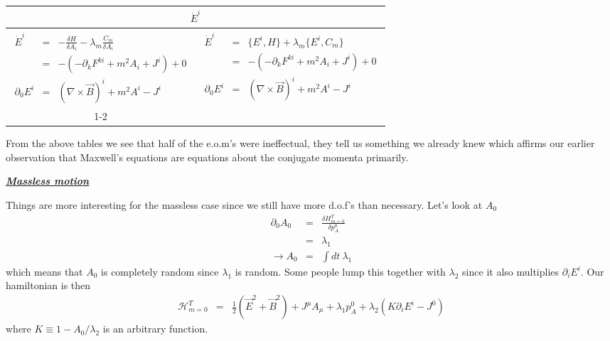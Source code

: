 \documentclass[aps,preprint,preprintnumbers,nofootinbib,showpacs,prd]{revtex4-1}
\newcommand{\ba}{\begin{array}}
\newcommand{\ea}{\end{array}}
\newcommand{\nbea}{\begin{eqnarray*}}
\newcommand{\neea}{\end{eqnarray*}}
\begin{document}
\begin{center}
    \begin{tabular}{ | c c |}
    \hline
    \multicolumn{2}{|c|}{$\dot E^i$} \\
    \hline
    $\ba {rcl}
\dot E^i & = & -\frac{\delta H}{\delta A_i} - \lambda_m \frac{C_m}{\delta A_i} \\
& = & -(-\partial_k F^{ki} + m^2 A_i + J^i) + 0 \\
\partial_0 E^i & = & (\nabla \times \vec B)^i + m^2 A^i - J^i
\ea$
     &
    $\ba {rcl}
\dot E^i & = & \{E^i, H\} + \lambda_m \{E^i, C_m\} \\
& = & -(-\partial_k F^{ki} + m^2 A_i + J^i) + 0 \\
\partial_0 E^i & = & (\nabla \times \vec B)^i + m^2 A^i - J^i
\ea$
      \\ \cline{1-2}
    \multicolumn{2}{|c|}{
   $\ba {rcl}
\{E^i, H^T\}^* & = & \{E^i, H\} - \{E^i, C_1\}\{C_1, C_2\}\{C_2, H\} - \{E^i, C_2\}\{C_2, C_1\}\{C_1, H\}  \\
\partial_0 E^i & = & -(-\partial_k F^{ki} + m^2 A_i + J^i) - 0 - 0 \\
\partial_0 E^i & = & (\nabla \times \vec B)^i + m^2 A^i - J^i
\ea$
    } \\
    \hline
    \end{tabular}
\end{center}
%
From the above tables we see that half of the e.o.m's were ineffectual, they tell us something we already knew which affirms our earlier observation that Maxwell's equations are equations about the conjugate momenta primarily.

\bigskip
\underline{\textit{\textbf{Massless motion}}}

Things are more interesting for the massless case since we still have more d.o.f's than necessary. Let's look at $A_0$
%
\nbea
\partial_0 A_0 & = & \frac{\delta H^T_{m = 0}}{\delta p^0_A} \\
& = & \lambda_1 \\
\to A_0 & = & \int dt~\lambda_1
\neea
%
which means that $A_0$ is completely random since $\lambda_1$ is random. Some people lump this together with $\lambda_2$ since it also multiplies $\partial_i E^{i}$. Our hamiltonian is then
%
\nbea
\mathcal{H}^T_{m = 0} & = & \frac{1}{2} \left ( \vec E^2 + \vec B^2 \right ) + J^\mu A_\mu + \lambda_1 p^0_A + \lambda_2 (K\partial_i E^{i} - J^0)
\neea
%
where $K \equiv 1 - A_0/\lambda_2$ is an arbitrary function.
\end{document}
